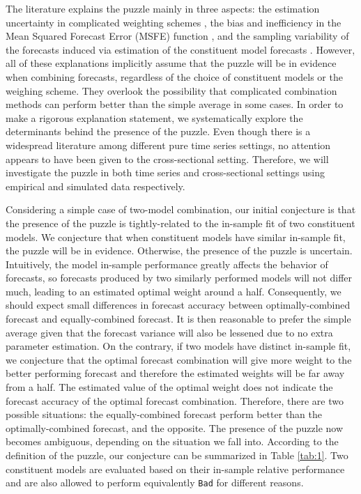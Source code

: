 \documentclass{monashthesis}
\begin{document}
The literature explains the puzzle mainly in three aspects: the estimation uncertainty in complicated weighting schemes \autocite{SW98,SW04,SW09}, the bias and inefficiency in the Mean Squared Forecast Error (MSFE) function \autocite{E11,CMVW16}, and the sampling variability of the forecasts induced via estimation of the constituent model forecasts \autocite{ZMFP22,FZMP23}. However, all of these explanations implicitly assume that the puzzle will be in evidence when combining forecasts, regardless of the choice of constituent models or the weighing scheme. They overlook the possibility that complicated combination methods can perform better than the simple average in some cases. In order to make a rigorous explanation statement, we systematically explore the determinants behind the presence of the puzzle. Even though there is a widespread literature among different pure time series settings, no attention appears to have been given to the cross-sectional setting. Therefore, we will investigate the puzzle in both time series and cross-sectional settings using empirical and simulated data respectively.

Considering a simple case of two-model combination, our initial conjecture is that the presence of the puzzle is tightly-related to the in-sample fit of two constituent models. We conjecture that when constituent models have similar in-sample fit, the puzzle will be in evidence. Otherwise, the presence of the puzzle is uncertain. Intuitively, the model in-sample performance greatly affects the behavior of forecasts, so forecasts produced by two similarly performed models will not differ much, leading to an estimated optimal weight around a half. Consequently, we should expect small differences in forecast accuracy between optimally-combined forecast and equally-combined forecast. It is then reasonable to prefer the simple average given that the forecast variance will also be lessened due to no extra parameter estimation. On the contrary, if two models have distinct in-sample fit, we conjecture that the optimal forecast combination will give more weight to the better performing forecast and therefore the estimated weights will be far away from a half. The estimated value of the optimal weight does not indicate the forecast accuracy of the optimal forecast combination. Therefore, there are two possible situations: the equally-combined forecast perform better than the optimally-combined forecast, and the opposite. The presence of the puzzle now becomes ambiguous, depending on the situation we fall into. According to the definition of the puzzle, our conjecture can be summarized in Table \ref{tab:1}. Two constituent models are evaluated based on their in-sample relative performance and are also allowed to perform equivalently \texttt{Bad} for different reasons.
\end{document}
